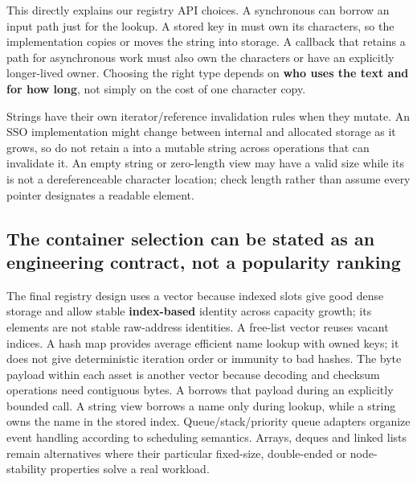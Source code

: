 This directly explains our registry API choices. A synchronous  can borrow an input path just for the lookup. A stored key in  must own its characters, so the implementation copies or moves the string into  storage. A callback that retains a path for asynchronous work must also own the characters or have an explicitly longer-lived owner. Choosing the right type depends on \textbf{who uses the text and for how long}, not simply on the cost of one character copy.

Strings have their own iterator/reference invalidation rules when they mutate. An SSO implementation might change between internal and allocated storage as it grows, so do not retain a  into a mutable string across operations that can invalidate it. An empty string or zero-length view may have a valid size while its  is not a dereferenceable character location; check length rather than assume every pointer designates a readable element.

\subsection{The container selection can be stated as an engineering contract, not a popularity ranking}\label{01-foundations-i-ch006-the-container-selection-can-be-stated-as-an-engineering-contract-not-a-popularity-ranking}

\hypertarget{01-foundations-i-ch006-the-container-selection-can-be-stated-as-an-engineering-contract-not-a-popularity-ranking}{}

The final registry design uses a vector because indexed slots give good dense storage and allow stable \textbf{index-based} identity across capacity growth; its elements are not stable raw-address identities. A free-list vector reuses vacant indices. A hash map provides average efficient name lookup with owned keys; it does not give deterministic iteration order or immunity to bad hashes. The byte payload within each asset is another vector because decoding and checksum operations need contiguous bytes. A  borrows that payload during an explicitly bounded call. A string view borrows a name only during lookup, while a string owns the name in the stored index. Queue/stack/priority queue adapters organize event handling according to scheduling semantics. Arrays, deques and linked lists remain alternatives where their particular fixed-size, double-ended or node-stability properties solve a real workload.

